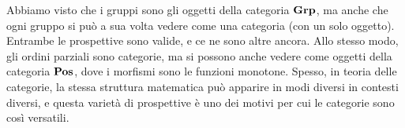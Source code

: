\begin{remark}
	Abbiamo visto che i gruppi sono gli oggetti della categoria \(\mathbf{Grp}\), ma anche che ogni gruppo si può a sua volta vedere come una categoria (con un solo oggetto). Entrambe le prospettive sono valide, e ce ne sono altre ancora.
	Allo stesso modo, gli ordini parziali sono categorie, ma si possono anche vedere come oggetti della categoria \(\mathbf{Pos}\), dove i morfismi sono le funzioni monotone.
	Spesso, in teoria delle categorie, la stessa struttura matematica può apparire in modi diversi in contesti diversi, e questa varietà di prospettive è uno dei motivi per cui le categorie sono così versatili.
\end{remark}







